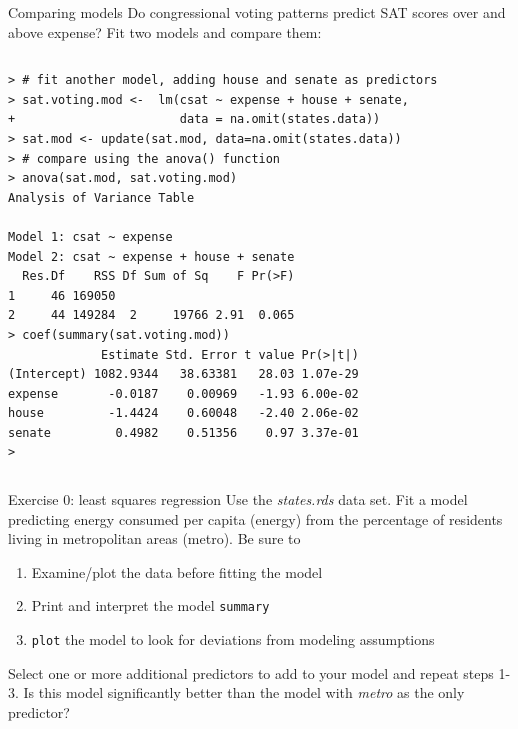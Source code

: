 \documentclass[table,smaller]{beamer}
\begin{document}
\begin{frame}[fragile,label=sec-2-7]{Comparing models}
 Do congressional voting patterns predict SAT scores over and above expense? Fit two models and compare them:
\vspace{-.5em}
\begin{columns}
\begin{block}{}
\begin{verbatim}
> # fit another model, adding house and senate as predictors
> sat.voting.mod <-  lm(csat ~ expense + house + senate,
+                       data = na.omit(states.data))
> sat.mod <- update(sat.mod, data=na.omit(states.data))
> # compare using the anova() function
> anova(sat.mod, sat.voting.mod)
Analysis of Variance Table

Model 1: csat ~ expense
Model 2: csat ~ expense + house + senate
  Res.Df    RSS Df Sum of Sq    F Pr(>F)
1     46 169050                         
2     44 149284  2     19766 2.91  0.065
> coef(summary(sat.voting.mod))
             Estimate Std. Error t value Pr(>|t|)
(Intercept) 1082.9344   38.63381   28.03 1.07e-29
expense       -0.0187    0.00969   -1.93 6.00e-02
house         -1.4424    0.60048   -2.40 2.06e-02
senate         0.4982    0.51356    0.97 3.37e-01
>
\end{verbatim}
\end{block}
\end{columns}
\vspace{.5em}
\end{frame}


\begin{frame}[fragile,label=sec-2-8]{Exercise 0: least squares regression}
 Use the \emph{states.rds} data set. Fit a model predicting  energy consumed per capita (energy) from the percentage of residents living in metropolitan areas (metro). Be sure to 
\begin{enumerate}
\item Examine/plot the data before fitting the model
\item Print and interpret the model \texttt{summary}
\item \texttt{plot} the model to look for deviations from modeling assumptions
\end{enumerate}

Select one or more additional predictors to add to your model and repeat steps 1-3. Is this model significantly better than the model with \emph{metro} as the only predictor?
\end{frame}
\end{document}
